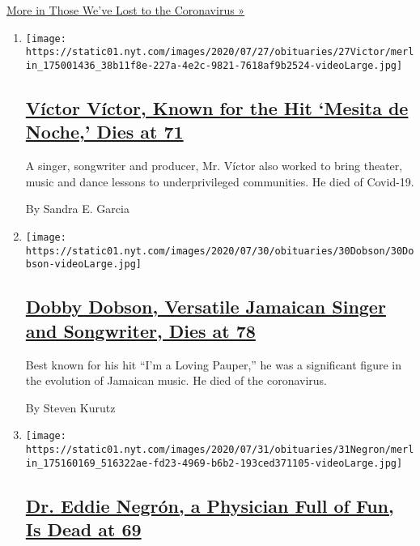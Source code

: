 \href{/series/people-died-coronavirus-obituaries}{More in Those We've
Lost to the Coronavirus »}

\begin{enumerate}
\def\labelenumi{\arabic{enumi}.}
\item
  \texttt{[image: https://static01.nyt.com/images/2020/07/27/obituaries/27Victor/merlin\_175001436\_38b11f8e-227a-4e2c-9821-7618af9b2524-videoLarge.jpg]}

  \hypertarget{vuxedctor-vuxedctor-known-for-the-hit-mesita-de-noche-dies-at-71}{%
  \subsection{\texorpdfstring{\href{/2020/08/01/obituaries/victor-victor-dead-coronavirus.html}{Víctor
  Víctor, Known for the Hit `Mesita de Noche,' Dies at
  71}}{Víctor Víctor, Known for the Hit `Mesita de Noche,' Dies at 71}}\label{vuxedctor-vuxedctor-known-for-the-hit-mesita-de-noche-dies-at-71}}

  A singer, songwriter and producer, Mr. Víctor also worked to bring
  theater, music and dance lessons to underprivileged communities. He
  died of Covid-19.

  By Sandra E. Garcia
\item
  \texttt{[image: https://static01.nyt.com/images/2020/07/30/obituaries/30Dobson/30Dobson-videoLarge.jpg]}

  \hypertarget{dobby-dobson-versatile-jamaican-singer-and-songwriter-dies-at-78}{%
  \subsection{\texorpdfstring{\href{/2020/07/31/obituaries/dobby-dobson-dead-coronavirus.html}{Dobby
  Dobson, Versatile Jamaican Singer and Songwriter, Dies at
  78}}{Dobby Dobson, Versatile Jamaican Singer and Songwriter, Dies at 78}}\label{dobby-dobson-versatile-jamaican-singer-and-songwriter-dies-at-78}}

  Best known for his hit ``I'm a Loving Pauper,'' he was a significant
  figure in the evolution of Jamaican music. He died of the coronavirus.

  By Steven Kurutz
\item
  \texttt{[image: https://static01.nyt.com/images/2020/07/31/obituaries/31Negron/merlin\_175160169\_516322ae-fd23-4969-b6b2-193ced371105-videoLarge.jpg]}

  \hypertarget{dr-eddie-negruxf3n-a-physician-full-of-fun-is-dead-at-69}{%
  \subsection{\texorpdfstring{\href{/2020/08/01/obituaries/eddie-negron-dead-coronavirus.html}{Dr.
  Eddie Negrón, a Physician Full of Fun, Is Dead at
  69}}{Dr. Eddie Negrón, a Physician Full of Fun, Is Dead at 69}}\label{dr-eddie-negruxf3n-a-physician-full-of-fun-is-dead-at-69}}


\end{enumerate}
